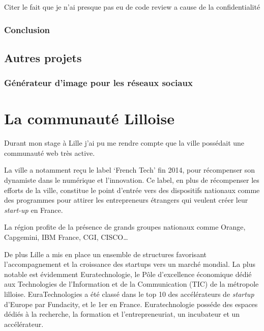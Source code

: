 \documentclass[12pt,a4paper]{article}
\begin{document}
  Citer le fait que je n'ai presque pas eu de code review a cause de la
  confidentialité

  \subsubsection{Conclusion}\label{conclusion-1}

  \subsection{Autres projets}\label{autres-projets}

  \subsubsection{Générateur d'image pour les réseaux
  sociaux}\label{guxe9nuxe9rateur-dimage-pour-les-ruxe9seaux-sociaux}

  \newpage

  \section{La communauté Lilloise}\label{la-communautuxe9-lilloise}

  Durant mon stage à Lille j'ai pu me rendre compte que la ville possédait
  une communauté web très active.

  \bigskip

  La ville a notamment reçu le label `French Tech' fin 2014, pour
  récompenser son dynamiste dans le numérique et l'innovation. Ce label,
  en plus de récompenser les efforts de la ville, constitue le point
  d'entrée vers des dispositifs nationaux comme des programmes pour
  attirer les entrepreneurs étrangers qui veulent créer leur
  \emph{start-up} en France.

  \bigskip

  La région profite de la présence de grands groupes nationaux comme
  Orange, Capgemini, IBM France, CGI, CISCO\ldots{}

  \bigskip

  De plus Lille a mis en place un ensemble de structures favorisant
  l'accompagnement et la croissance des startups vers un marché mondial.
  La plus notable est évidemment Euratechnologie, le Pôle d'excellence
  économique dédié aux Technologies de l'Information et de la
  Communication (TIC) de la métropole lilloise. EuraTechnologies a été
  classé dans le top 10 des accélérateurs de \emph{startup} d'Europe par
  Fundacity, et le 1er en France. Euratechnologie posséde des espaces
  dédiés à la recherche, la formation et l'entrepreneuriat, un incubateur
  et un accélérateur.
\end{document}
